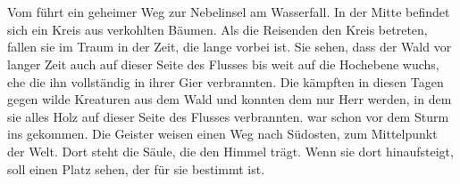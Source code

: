 \documentclass[12pt,a4paper,onecolumn,oneside,ngerman]{book}
\begin{document}
\chapter{\Darmon}
Vom {\Abaton} führt ein geheimer Weg zur Nebelinsel {\Darmon} am Wasserfall. In der Mitte befindet sich ein Kreis aus verkohlten Bäumen.\linebreak
Als die Reisenden den Kreis betreten, fallen sie im Traum in der Zeit, die lange vorbei ist. Sie sehen, dass der Wald vor langer Zeit auch auf dieser Seite des Flusses bis weit auf die Hochebene wuchs, ehe die {\Eisenmeister} ihn vollständig in ihrer Gier verbrannten. Die {\Eisenmeister} kämpften in diesen Tagen gegen wilde Kreaturen aus dem Wald und konnten dem nur Herr werden, in dem sie alles Holz auf dieser Seite des Flusses verbrannten.\linebreak
{\Sena} war schon vor dem Sturm ins {\Enland} gekommen. Die Geister weisen {\Sena} einen Weg nach Südosten, zum Mittelpunkt der Welt. Dort steht die Säule, die den Himmel trägt. Wenn sie dort hinaufsteigt, soll einen Platz sehen, der für sie bestimmt ist.

\end{document}
